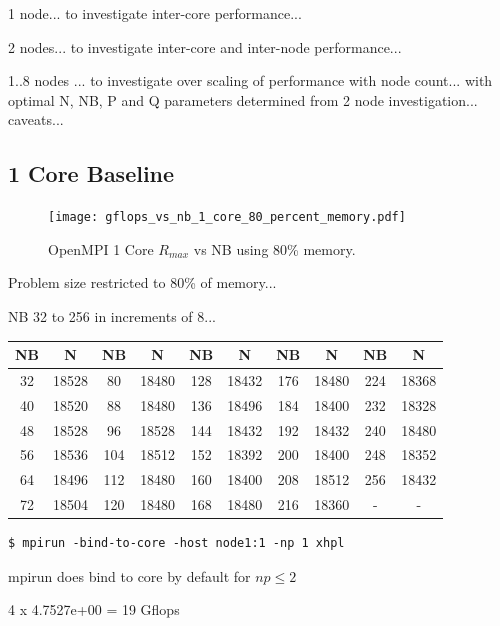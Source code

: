 \documentclass{report}
\begin{document}
1 node... to investigate inter-core performance...

2 nodes... to investigate inter-core and inter-node performance...

1..8 nodes ... to investigate over scaling of performance with node count... with optimal N, NB, P and Q parameters determined from 2 node investigation... caveats...



\subsection{1 Core Baseline}

\begin{figure}[h]
	\centering	
	\texttt{[image: gflops\_vs\_nb\_1\_core\_80\_percent\_memory.pdf]}
	\caption{OpenMPI 1 Core $R_{max}$ vs NB using 80\% memory.}
\end{figure}

Problem size restricted to 80\% of memory...

NB 32 to 256 in increments of 8...

\begin{center}
	\begin{tabular}{ |c|c|c|c|c|c|c|c|c|c| } 
		\hline
		NB & N & NB & N & NB & N & NB & N & NB & N \\ 
		\hline
		32 & 18528 &  80 & 18480 & 128 & 18432 & 176 & 18480 & 224 & 18368 \\ 
		40 & 18520 &  88 & 18480 & 136 & 18496 & 184 & 18400 & 232 & 18328 \\ 
 		48 & 18528 &  96 & 18528 & 144 & 18432 & 192 & 18432 & 240 & 18480 \\
		56 & 18536 & 104 & 18512 & 152 & 18392 & 200 & 18400 & 248 & 18352 \\ 
 		64 & 18496 & 112 & 18480 & 160 & 18400 & 208 & 18512 & 256 & 18432 \\
		72 & 18504 & 120 & 18480 & 168 & 18480 & 216 & 18360 &   - &     - \\ 
 		\hline
	\end{tabular}
\end{center}

\lstset{style=type}
\begin{lstlisting}
$ mpirun -bind-to-core -host node1:1 -np 1 xhpl
\end{lstlisting}

mpirun does bind to core by default for $np \leq 2$


4 x 4.7527e+00 = 19 Gflops
\end{document}
